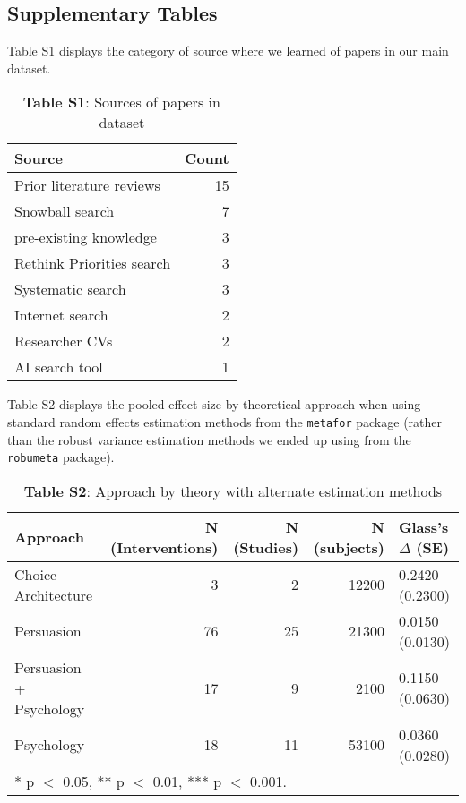 \documentclass[sn-nature,referee,pdflatex]{sn-jnl}
\begin{document}
\subsection{Supplementary Tables}\label{sec5.3}

Table S1 displays the category of source where we learned of papers in
our main dataset. \captionsetup[table]{labelformat=empty}

\begin{table}[!h]
\centering
\caption{\label{tab:supp_table_one}\textbf{Table S1}: Sources of papers in dataset}
\centering
\begin{tabular}[t]{lr}
\toprule
Source & Count\\
\midrule
Prior literature reviews & 15\\
Snowball search & 7\\
pre-existing knowledge & 3\\
Rethink Priorities search & 3\\
Systematic search & 3\\
\addlinespace
Internet search & 2\\
Researcher CVs & 2\\
AI search tool & 1\\
\bottomrule
\end{tabular}
\end{table}

Table S2 displays the pooled effect size by theoretical approach when
using standard random effects estimation methods from the
\texttt{metafor} package (rather than the robust variance estimation
methods we ended up using from the \texttt{robumeta} package).

\begin{table}[!h]
\centering
\caption{\label{tab:supp_table_two}\textbf{Table S2}: Approach by theory with alternate estimation methods }
\centering
\begin{tabular}[t]{lrrrl}
\toprule
Approach & N (Interventions) & N (Studies) & N (subjects) & Glass's $\Delta$ (SE)\\
\midrule
Choice Architecture & 3 & 2 & 12200 & 0.2420 (0.2300)\\
Persuasion & 76 & 25 & 21300 & 0.0150 (0.0130)\\
Persuasion + Psychology & 17 & 9 & 2100 & 0.1150 (0.0630)\\
Psychology & 18 & 11 & 53100 & 0.0360 (0.0280)\\
\bottomrule
\multicolumn{5}{l}{\rule{0pt}{1em}* p $<$ 0.05, ** p $<$ 0.01, *** p $<$ 0.001.}\\
\end{tabular}
\end{table}
\end{document}
